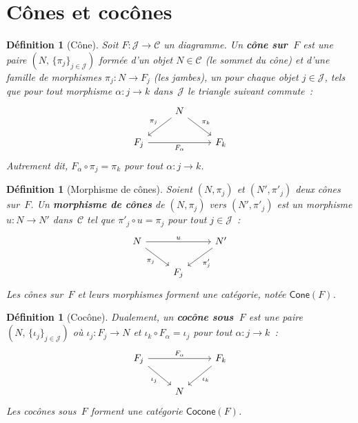 \documentclass[a4paper,12pt]{book}
\newtheorem{definition}[theoreme]{Définition}
\begin{document}
\section{Cônes et cocônes}\label{sec:cones}

\begin{definition}[Cône]\label{def:cone}
Soit $F\colon \mathcal{J}\to\mathcal{C}$ un diagramme.
Un \textbf{cône sur~$F$} est une paire $(N,\,\{\pi_j\}_{j\in\mathcal{J}})$
formée d'un objet $N\in\mathcal{C}$ (le \emph{sommet} du cône)
et d'une famille de morphismes $\pi_j\colon N\to F_j$ (les \emph{jambes}),
un pour chaque objet $j\in\mathcal{J}$,
tels que pour tout morphisme $\alpha\colon j\to k$ dans~$\mathcal{J}$
le triangle suivant commute~:
\[
\begin{tikzcd}
& N \arrow[dl, "\pi_j"'] \arrow[dr, "\pi_k"] & \\
F_j \arrow[rr, "F_\alpha"'] & & F_k
\end{tikzcd}
\]
Autrement dit, $F_\alpha \circ \pi_j = \pi_k$ pour tout $\alpha\colon j\to k$.
\end{definition}

\begin{definition}[Morphisme de cônes]\label{def:morphisme-cone}
Soient $(N,\pi_j)$ et $(N',\pi'_j)$ deux cônes sur~$F$.
Un \textbf{morphisme de cônes} de $(N,\pi_j)$ vers $(N',\pi'_j)$
est un morphisme $u\colon N\to N'$ dans~$\mathcal{C}$ tel que
$\pi'_j \circ u = \pi_j$ pour tout $j\in\mathcal{J}$~:
\[
\begin{tikzcd}
N \arrow[rr, "u"] \arrow[dr, "\pi_j"'] && N' \arrow[dl, "\pi'_j"] \\
& F_j &
\end{tikzcd}
\]
Les cônes sur~$F$ et leurs morphismes forment une catégorie,
notée $\mathsf{Cone}(F)$.
\end{definition}

\begin{definition}[Cocône]\label{def:cocone}
Dualement, un \textbf{cocône sous~$F$} est une paire
$(N,\,\{\iota_j\}_{j\in\mathcal{J}})$ où $\iota_j\colon F_j\to N$
et $\iota_k \circ F_\alpha = \iota_j$ pour tout $\alpha\colon j\to k$~:
\[
\begin{tikzcd}
F_j \arrow[rr, "F_\alpha"] \arrow[dr, "\iota_j"'] & & F_k \arrow[dl, "\iota_k"] \\
& N &
\end{tikzcd}
\]
Les cocônes sous~$F$ forment une catégorie $\mathsf{Cocone}(F)$.
\end{definition}
\end{document}
